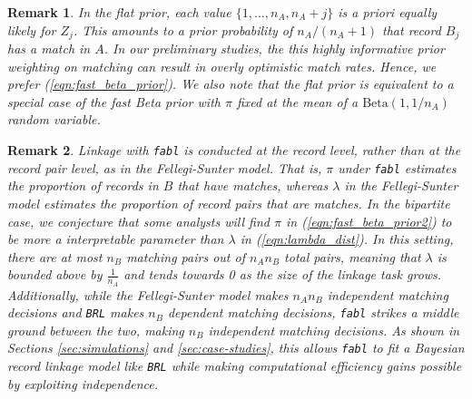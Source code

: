 \documentclass[ba]{imsart}
\newtheorem{rem}{Remark}
\begin{document}
\begin{rem}
In the \cite{wortman2019} flat prior, each value $\{1, \ldots, n_A, n_A +j\}$ is a priori equally likely for $Z_j$. This amounts to a prior probability of $n_A / (n_A + 1)$ that record $B_j$ has a match in $A$. In our preliminary studies, the this highly informative prior weighting on matching can result in overly optimistic match rates. Hence, we prefer (\ref{eqn:fast_beta_prior}). We also note that the flat prior is equivalent to a special case of the fast Beta prior with $\pi$ fixed at the mean of a $\text{Beta}\left(1, 1 / n_A \right)$ random variable.
\end{rem}

\begin{rem}
Linkage with \texttt{fabl} is conducted at the record level, rather than at the record pair level, as in the Fellegi-Sunter model. That is, $\pi$ under \texttt{fabl} estimates the proportion of records in $B$ that have matches, whereas $\lambda$ in the Fellegi-Sunter model estimates the proportion of record pairs that are matches. In the bipartite case, we conjecture that some analysts will find $\pi$ in (\ref{eqn:fast_beta_prior2}) to be more a interpretable parameter than $\lambda$ in (\ref{eqn:lambda_dist}). In this setting, there are at most $n_B$ matching pairs out of $n_A n_B$ total pairs, meaning that $\lambda$ is bounded above by $\frac{1}{n_A}$ and tends towards 0 as the size of the linkage task grows. Additionally, while the Fellegi-Sunter model makes $n_A  n_B$ independent matching decisions and \texttt{BRL} makes $n_B$ dependent matching decisions, \texttt{fabl} strikes a middle ground between the two, making $n_B$  independent matching decisions. As shown in Sections \ref{sec:simulations} and \ref{sec:case-studies}, this allows \texttt{fabl} to fit a Bayesian record linkage model like \texttt{BRL} while making computational efficiency gains possible by exploiting independence. 
\end{rem}






\end{document}
